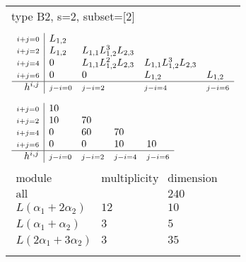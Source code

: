 \documentclass[crop,border=2mm]{standalone}
\begin{document}
\begin{tabular}{l}
{\huge type B2, s=2, subset=[2]}\\ \\


$\displaystyle
\begin{array}{r|l l l l}
	{\scriptstyle i+j=0}&L_{1,2}&&&\\
	{\scriptstyle i+j=2}&L_{1,2}&L_{1,1}L_{1,2}^{3}L_{2,3}&&\\
	{\scriptstyle i+j=4}&0&L_{1,1}L_{1,2}^{2}L_{2,3}&L_{1,1}L_{1,2}^{3}L_{2,3}&\\
	{\scriptstyle i+j=6}&0&0&L_{1,2}&L_{1,2}\\
	\hline h^{i,j}&{\scriptstyle j-i=0}&{\scriptstyle j-i=2}&{\scriptstyle j-i=4}&{\scriptstyle j-i=6}
\end{array}
$ \\ \\


$\displaystyle
\begin{array}{r|l l l l}
	{\scriptstyle i+j=0}&10&&&\\
	{\scriptstyle i+j=2}&10&70&&\\
	{\scriptstyle i+j=4}&0&60&70&\\
	{\scriptstyle i+j=6}&0&0&10&10\\
	\hline h^{i,j}&{\scriptstyle j-i=0}&{\scriptstyle j-i=2}&{\scriptstyle j-i=4}&{\scriptstyle j-i=6}
\end{array}
$ \\ \\


$\displaystyle
\begin{array}{rll}
	\text{module}&\text{multiplicity}&\text{dimension} \\ \hline \text{all}&&240 \\
	L\left(\alpha_{1}+ 2\alpha_{2}\right)&12&10\\
	L\left(\alpha_{1}+\alpha_{2}\right)&3&5\\
	L\left( 2\alpha_{1}+ 3\alpha_{2}\right)&3&35
\end{array}
$ \\ \\

\end{tabular}
\end{document}
